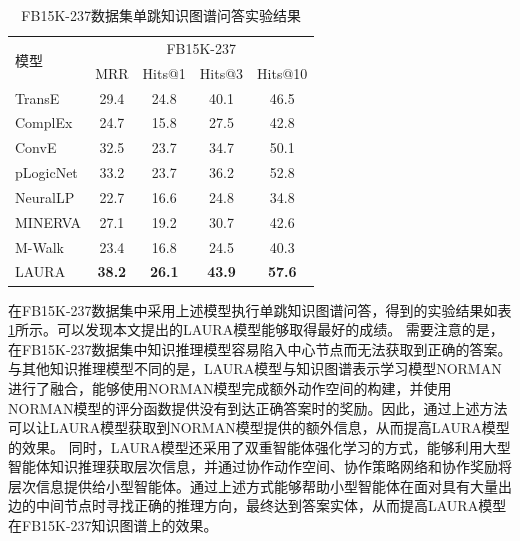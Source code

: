 \documentclass[algorithmlist, AutoFakeBold, AutoFakeSlant, figurelist, tablelist, nomlist, engineering]{seuthesix}
\begin{document}
\begin{table}[t]
  \centering
  \caption{FB15K-237数据集单跳知识图谱问答实验结果}
  \begin{tabular*}{0.95\textwidth}{@{\extracolsep{\fill}}lcccc}
    \toprule[1pt]
    \multirow{2}{*}{模型} & \multicolumn{4}{c}{FB15K-237}   \\
      & MRR & Hits@1 & Hits@3 & Hits@10 \\ \hline
    TransE & 29.4 & 24.8 & 40.1 & 46.5 \\
    ComplEx & 24.7 & 15.8 & 27.5 & 42.8 \\
    ConvE & 32.5 & 23.7 & 34.7 & 50.1 \\
    pLogicNet & 33.2 & 23.7 & 36.2 & 52.8 \\
    NeuralLP & 22.7 & 16.6 & 24.8 & 34.8 \\
    MINERVA & 27.1 & 19.2 & 30.7 & 42.6 \\
    M-Walk & 23.4 & 16.8 & 24.5 & 40.3 \\
    LAURA & \textbf{38.2} & \textbf{26.1} & \textbf{43.9} & \textbf{57.6} \\
    \bottomrule[1pt]
  \end{tabular*}
  \label{Experiment2_FB15K-237}
\end{table}
在FB15K-237数据集中采用上述模型执行单跳知识图谱问答，得到的实验结果如表\ref{Experiment2_FB15K-237}所示。可以发现本文提出的LAURA模型能够取得最好的成绩。
需要注意的是，在FB15K-237数据集中知识推理模型容易陷入中心节点而无法获取到正确的答案。与其他知识推理模型不同的是，LAURA模型与知识图谱表示学习模型NORMAN进行了融合，能够使用NORMAN模型完成额外动作空间的构建，并使用NORMAN模型的评分函数提供没有到达正确答案时的奖励。因此，通过上述方法可以让LAURA模型获取到NORMAN模型提供的额外信息，从而提高LAURA模型的效果。
同时，LAURA模型还采用了双重智能体强化学习的方式，能够利用大型智能体知识推理获取层次信息，并通过协作动作空间、协作策略网络和协作奖励将层次信息提供给小型智能体。通过上述方式能够帮助小型智能体在面对具有大量出边的中间节点时寻找正确的推理方向，最终达到答案实体，从而提高LAURA模型在FB15K-237知识图谱上的效果。
\end{document}
